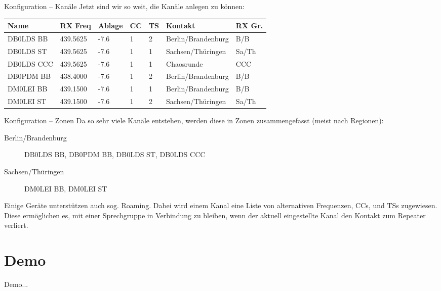 \documentclass[aspectratio=169]{beamer}
\begin{document}
\begin{frame}{Konfiguration -- Kanäle}
 Jetzt sind wir so weit, die Kanäle anlegen zu können:
 \begin{center}
 \begin{tabular}{|l|llllll|}\hline
 Name & RX Freq & Ablage & CC & TS & Kontakt & RX Gr. \\ \hline \hline
 DB0LDS BB  & 439.5625 & -7.6 & 1 & 2 & Berlin/Brandenburg & B/B  \\
 DB0LDS ST  & 439.5625 & -7.6 & 1 & 1 & Sachsen/Thüringen  & Sa/Th  \\
 DB0LDS CCC & 439.5625 & -7.6 & 1 & 1 & Chaosrunde         & CCC  \\
 DB0PDM BB  & 438.4000 & -7.6 & 1 & 2 & Berlin/Brandenburg & B/B  \\
 DM0LEI BB  & 439.1500 & -7.6 & 1 & 1 & Berlin/Brandenburg & B/B  \\
 DM0LEI ST  & 439.1500 & -7.6 & 1 & 2 & Sachsen/Thüringen  & Sa/Th \\ \hline
 \end{tabular}
 \end{center}
\end{frame}

\begin{frame}{Konfiguration -- Zonen}
 Da so sehr viele Kanäle entstehen, werden diese in Zonen zusammengefasst (meist nach Regionen):\\[0.5cm]
 \begin{description}
  \item[Berlin/Brandenburg] DB0LDS BB, DB0PDM BB, DB0LDS ST, DB0LDS CCC
  \item[Sachsen/Thüringen] DM0LEI BB, DM0LEI ST
 \end{description}\vspace{0.5cm}
 
 \pause Einige Geräte unterstützen auch sog. Roaming. Dabei wird einem Kanal eine Liste von alternativen Frequenzen, CCs, und TSs zugewiesen. Diese ermöglichen es, mit einer Sprechgruppe in Verbindung zu bleiben, wenn der aktuell eingestellte Kanal den Kontakt zum Repeater verliert.
\end{frame}

\section{Demo}
\begin{frame}
\begin{block}{}
 Demo...
\end{block}
\end{frame}
\end{document}
